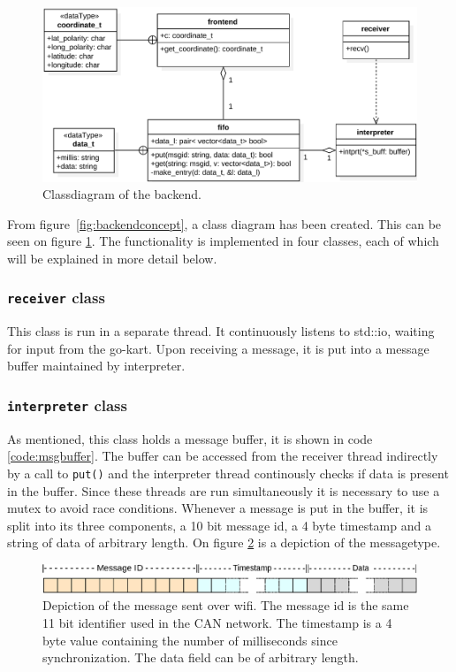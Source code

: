 \begin{figure}[H]
	\includegraphics[width=\linewidth]{graphics/backend_class_diagram}
	\caption[Backend class diagram.]{Classdiagram of the backend.}
	\label{fig:backendclass}
\end{figure}
From figure~\ref{fig:backendconcept}, a class diagram has been created.
This can be seen on figure \ref{fig:backendclass}.
The functionality is implemented in four classes, each of which will be explained in more detail below.

\subsubsection*{\texttt{receiver} class}
This class is run in a separate thread.
It continuously listens to std::io, waiting for input from the go-kart.
Upon receiving a message, it is put into a message buffer maintained by interpreter.

\subsubsection*{\texttt{interpreter} class}\label{sub:backend_intepreter}
As mentioned, this class holds a message buffer, it is shown in code \ref{code:msgbuffer}.
The buffer can be accessed from the receiver thread indirectly by a call to \texttt{put()} and the interpreter thread continously checks if data is present in the buffer.
Since these threads are run simultaneously it is necessary to use a mutex to avoid race conditions.
Whenever a message is put in the buffer, it is split into its three components, a 10 bit message id, a 4 byte timestamp and a string of data of arbitrary length.
On figure \ref{fig:backendmsg} is a depiction of the messagetype.
\begin{figure}[H]
	\includegraphics[width=\linewidth]{graphics/backend_message}
	\caption[Front end message.]{Depiction of the message sent over wifi. The message id is the same 11 bit identifier used in the CAN network.
	The timestamp is a 4 byte value containing the number of milliseconds since synchronization.
	The data field can be of arbitrary length.}
	\label{fig:backendmsg}
\end{figure}

